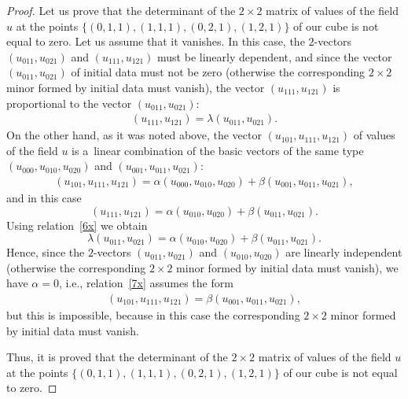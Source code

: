 \documentclass[pdftex]{sigma}
\begin{document}
\begin{proof}
Let us prove that the determinant of the $2 \times 2$ matrix of
values of the f\/ield $u$ at the points $\{(0, 1, 1), (1, 1, 1), (0,
2, 1), (1, 2, 1)\}$ of our cube is not equal to zero. Let us assume
that it va\-nishes. In this case, the $2$-vectors $(u_{0 1 1}, u_{0 2
1})$ and $(u_{1 1 1}, u_{1 2 1})$ must be linearly dependent, and
since the vector $(u_{0 1 1}, u_{0 2 1})$ of initial data must not
be zero (otherwise the corresponding $2 \times 2$ minor formed by
initial data must vanish), the vector $(u_{1 1 1}, u_{1 2 1})$ is
proportional to the vector $(u_{0 1 1}, u_{0 2 1})$: \begin{gather} (u_{1 1 1},
u_{1 2 1}) = \lambda (u_{0 1 1}, u_{0 2 1}). \label{6x} \end{gather} On the
other hand, as it was noted above, the vector $(u_{1 0 1}, u_{1 1
1}, u_{1 2 1})$ of values of the f\/ield $u$ is a~linear combination
of the basic vectors of the same type $(u_{0 0 0}, u_{0 1 0}, u_{0 2
0})$ and $(u_{0 0 1}, u_{0 1 1}, u_{0 2 1})$:
\begin{gather}
(u_{1 0 1}, u_{1 1 1}, u_{1 2 1}) = \alpha (u_{0 0 0}, u_{0 1
0}, u_{0 2 0}) + \beta (u_{0 0 1}, u_{0 1 1}, u_{0 2 1}),
\label{7x}
\end{gather}
and in this case \[ (u_{1 1 1}, u_{1 2 1}) = \alpha (u_{0 1 0},
u_{0 2 0}) + \beta (u_{0 1 1}, u_{0 2 1}). \] Using relation~\eqref{6x}
we obtain \[ \lambda (u_{0 1 1}, u_{0 2 1}) = \alpha
(u_{0 1 0}, u_{0 2 0}) + \beta (u_{0 1 1}, u_{0 2 1}). \] Hence,
since the $2$-vectors $(u_{0 1 1}, u_{0 2 1})$ and $(u_{0 1 0}, u_{0
2 0})$ are linearly independent (otherwise the corresponding $2
\times 2$ minor formed by initial data must vanish), we have $\alpha
= 0$, i.e., relation~\eqref{7x} assumes the form
\begin{gather*} (u_{1 0 1},
u_{1 1 1}, u_{1 2 1}) = \beta (u_{0 0 1}, u_{0 1 1}, u_{0 2 1}),
\end{gather*}
but this is impossible, because in this case the
corresponding $2 \times 2$ minor formed by initial data must vanish.


Thus, it is proved that the determinant of the $2 \times 2$ matrix
of values of the f\/ield $u$ at the points $\{(0, 1, 1), (1, 1, 1),
(0, 2, 1), (1, 2, 1)\}$ of our cube is not equal to zero.





\end{proof}
\end{document}
